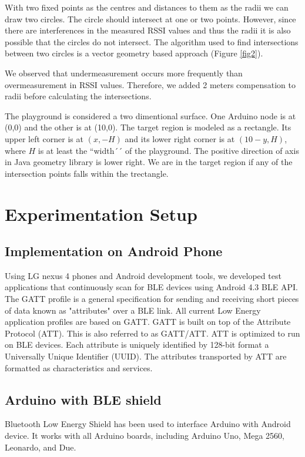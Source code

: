 \documentclass[conference,a4paper]{../../sty/IEEEtran}
\begin{document}
With two fixed points as the centres and distances to them as the radii we can draw two circles.
The circle should intersect at one or two points.
However, since there are interferences in the measured RSSI values and thus the radii it is also possible that the circles do not intersect.
The algorithm used to find intersections between two circles is a vector geometry based approach (Figure \ref{fig2})\cite{cshint}.

We observed that undermeasurement occurs more frequently than overmeasurement in RSSI values.
Therefore, we added 2 meters compensation to radii before calculating the intersections.

The playground is considered a two dimentional surface.
One Arduino node is at (0,0) and the other is at (10,0).
The target region is modeled as a rectangle.
Its upper left corner is at $(x, -H)$ and its lower right corner is at $(10-y, H)$, where $H$ is at least the ``width´´ of the playground.
The positive direction of axis in Java geometry library is lower right.
We are in the target region if any of the intersection points falls within the trectangle.

\section{Experimentation Setup}

\subsection{Implementation on Android Phone}

Using LG nexus 4 phones and Android development tools, we developed test applications that continuously scan for BLE devices using Android 4.3 BLE API. The GATT profile is a general specification for sending and receiving short pieces of data known as "attributes" over a BLE link. All current Low Energy application profiles are based on GATT. GATT is built on top of the Attribute Protocol (ATT). This is also referred to as GATT/ATT. ATT is optimized to run on BLE devices. Each attribute is uniquely identified by 128-bit format a Universally Unique Identifier (UUID). The attributes transported by ATT are formatted as characteristics and services.

\subsection{Arduino with BLE shield}

Bluetooth Low Energy Shield has been used to interface Arduino with Android device. It works with all Arduino boards, including Arduino Uno, Mega 2560, Leonardo, and Due. 
\end{document}
